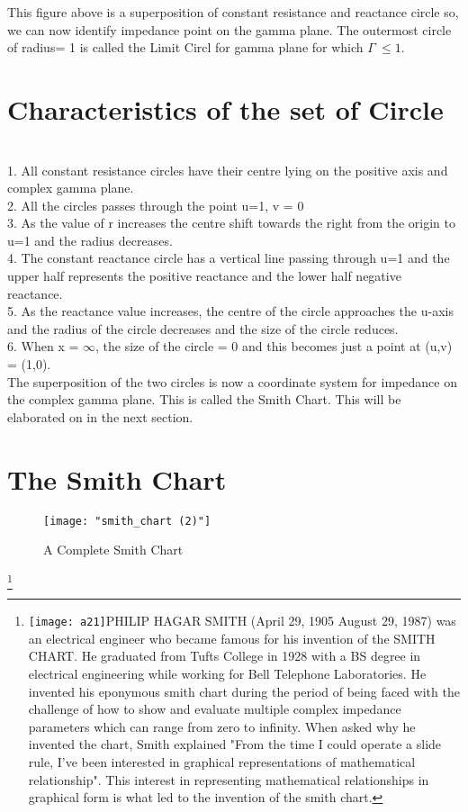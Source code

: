 This figure above is a superposition of constant resistance and reactance circle so, we can now identify impedance point on the gamma plane.  The outermost circle of radius= 1 is called the Limit Circl for gamma plane for which $ \Gamma\ \leq 1$.\\


\section{Characteristics of the set of Circle}\\

1.	All constant resistance circles have their centre lying on the positive axis and complex gamma plane.\\
2.	All the circles passes through the point u=1, v = 0\\
3.	As the value of r increases the centre shift towards the right from the origin to u=1 and the radius decreases.\\
4.	The constant reactance circle has a vertical line passing through u=1 and the upper half represents the positive reactance and the lower half negative reactance.\\
5.	As the reactance value increases, the centre of the circle approaches the u-axis and the radius of the circle decreases and the size of the circle reduces.\\
6.	When x = $\infty$, the size of the circle = 0  and this  becomes just a point at (u,v) = (1,0).\\

The superposition of the two circles is now a coordinate system for impedance on the complex gamma plane. This is called the Smith Chart.  This will be elaborated on in  the next section.
\section{\textbf{The Smith Chart}}
\begin{figure}[h]
	\centering
	\texttt{[image: "smith\_chart (2)"]}
	\caption{A Complete Smith Chart}
	\label{fig:smithchart-2}
\end{figure}
	
\footnote{\texttt{[image: a21]}PHILIP HAGAR SMITH (April 29, 1905  August 29, 1987) was an electrical engineer who became famous for his invention of the SMITH CHART. He graduated from Tufts College in 1928 with a BS degree in electrical engineering while working for Bell Telephone Laboratories. He invented his eponymous smith chart during the period of being faced with the challenge of how to show and evaluate multiple complex impedance parameters which can range from zero to infinity. When asked why he invented the chart, Smith explained "From the time I could operate a slide rule, I've been interested in graphical representations of mathematical relationship". This interest in representing mathematical relationships in graphical form is what led to the invention of the smith chart.}



